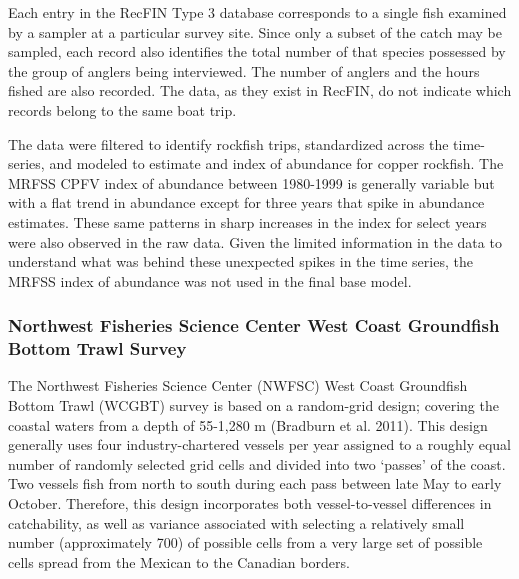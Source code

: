 \documentclass[11pt,
  english,
  letterpaper,
]{article}
\begin{document}
Each entry in the RecFIN Type 3 database corresponds to a single fish examined by a sampler at a particular survey site. Since only a subset of the catch may be sampled, each record also identifies the total number of that species possessed by the group of anglers being interviewed. The number of anglers and the hours fished are also recorded. The data, as they exist in RecFIN, do not indicate which records belong to the same boat trip.

The data were filtered to identify rockfish trips, standardized across the time-series, and modeled to estimate and index of abundance for copper rockfish. The MRFSS CPFV index of abundance between 1980-1999 is generally variable but with a flat trend in abundance except for three years that spike in abundance estimates. These same patterns in sharp increases in the index for select years were also observed in the raw data. Given the limited information in the data to understand what was behind these unexpected spikes in the time series, the MRFSS index of abundance was not used in the final base model.

\hypertarget{northwest-fisheries-science-center-west-coast-groundfish-bottom-trawl-survey}{%
\subsubsection{Northwest Fisheries Science Center West Coast Groundfish Bottom Trawl Survey}\label{northwest-fisheries-science-center-west-coast-groundfish-bottom-trawl-survey}}

The Northwest Fisheries Science Center (NWFSC) West Coast Groundfish Bottom Trawl (WCGBT) survey is based on a random-grid design; covering the coastal waters from a depth of 55-1,280 m (Bradburn et al. 2011). This design generally uses four industry-chartered vessels per year assigned to a roughly equal number of randomly selected grid cells and divided into two `passes' of the coast. Two vessels fish from north to south during each pass between late May to early October. Therefore, this design incorporates both vessel-to-vessel differences in catchability, as well as variance associated with selecting a relatively small number (approximately 700) of possible cells from a very large set of possible cells spread from the Mexican to the Canadian borders.
\end{document}
